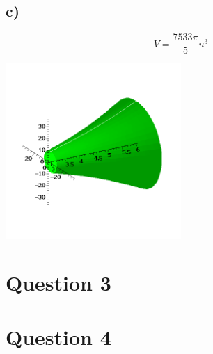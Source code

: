 \documentclass[12pt]{article}
\begin{document}
\subsection*{c)}
\[
    V = \frac{7533 \pi}{5} u^3
\]
\begin{center}\includegraphics[width=0.5\textwidth, trim={2cm 1cm 2cm 3cm},clip]{plots/q2c.png}\end{center}

\section*{Question 3}

\section*{Question 4}
\end{document}
